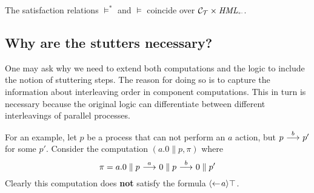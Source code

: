 \begin{remark}
    The satisfaction relations $\vDash^*$ and $\vDash$ coincide over $\mathcal{C}_{\mathcal{T}} \times \textit{HML}_\shortleftarrow$.
\end{remark}


\subsection{Why are the stutters necessary?}

One may ask why we need to extend both computations and the logic to include the
notion of stuttering steps. The reason for doing so is to capture the information
about interleaving order in component computations. This in turn is necessary because
the original logic can differentiate between different interleavings of parallel
processes.

For an example, let $p$ be a process that can not perform an $a$ action, but
$p\ {\stackrel{{b}}{\longrightarrow}}\  p'$ for some $p'$. Consider the computation $(a.0 \parallel p, \pi)$
where
\begin{equation}\label{eq:interleave1}
    \pi = a.0 \parallel p \ {\stackrel{{a}}{\longrightarrow}}\  0 \parallel p \ {\stackrel{{b}}{\longrightarrow}}\  0 \parallel p'
\end{equation}
Clearly this computation does {\bf not} satisfy the formula $\mbox{\ensuremath{\langle\leftarrow\! a \rangle}}\top$.

